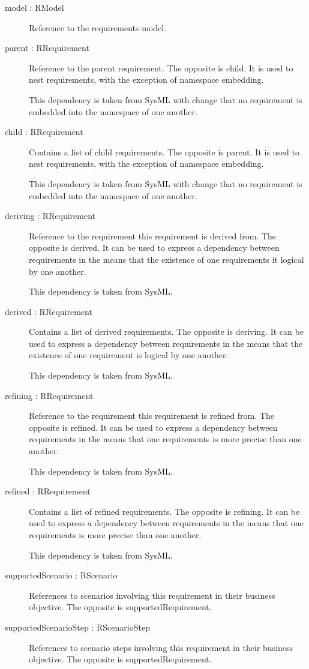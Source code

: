 \begin{description}
	\item[model : RModel] Reference to the requirements model.
	\item[parent : RRequirement] Reference to the parent requirement. The opposite is child.
It is used to nest requirements, with the exception of namespace embedding.

This dependency is taken from SysML with change that no requirement is embedded into the namespace of one another.
	\item[child : RRequirement] Contains a list of child requirements. The opposite is parent.
It is used to nest requirements, with the exception of namespace embedding.

This dependency is taken from SysML with change that no requirement is embedded into the namespace of one another.
	\item[deriving : RRequirement] Reference to the requirement this requirement is derived from. The opposite is derived.
It can be used to express a dependency between requirements in the means that the existence of one requirements it logical by one another.

This dependency is taken from SysML.
	\item[derived : RRequirement] Contains a list of derived requirements. The opposite is deriving.
It can be used to express a dependency between requirements in the means that the existence of one requirement is logical by one another.

This dependency is taken from SysML.
	\item[refining : RRequirement] Reference to the requirement this requirement is refined from. The opposite is refined.
It can be used to express a dependency between requirements in the means that one requirements is more precise than one another.

This dependency is taken from SysML.
	\item[refined : RRequirement] Contains a list of refined requirements. The opposite is refining.
It can be used to express a dependency between requirements in the means that one requirements is more precise than one another.

This dependency is taken from SysML.
	\item[supportedScenario : RScenario] References to scenarios involving this requirement in their business objective.
The opposite is supportedRequirement.
	\item[supportedScenarioStep : RScenarioStep] References to scenario steps involving this requirement in their business objective.
The opposite is supportedRequirement.
\end{description}

